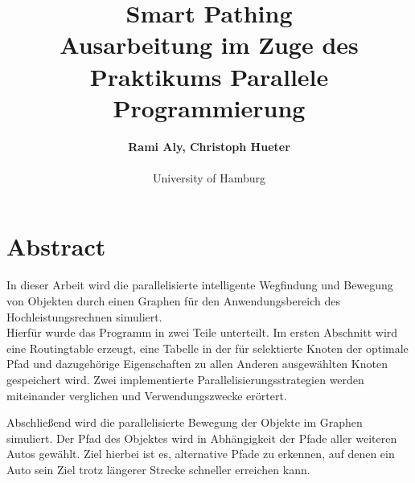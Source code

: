 \documentclass[paper=A4,pagesize=auto,12pt,headinclude=true,footinclude=true,BCOR=0mm,DIV=calc]{scrartcl}
\begin{document}
	
	\title{Smart Pathing\\
	\small{Ausarbeitung im Zuge des Praktikums Parallele Programmierung}}
	\author{\textbf{Rami Aly, Christoph Hueter}\\
	\\University of Hamburg}

	\maketitle
	
	\section*{Abstract}
	In dieser Arbeit wird die parallelisierte intelligente Wegfindung und Bewegung von Objekten durch einen Graphen für den Anwendungsbereich des Hochleistungsrechnen simuliert.\\
	
	Hierfür wurde das Programm in zwei Teile unterteilt. Im ersten Abschnitt wird eine Routingtable erzeugt, eine Tabelle in der für selektierte Knoten der optimale Pfad und dazugehörige Eigenschaften zu allen Anderen ausgewählten Knoten gespeichert wird. Zwei implementierte Parallelisierungsstrategien werden miteinander verglichen und Verwendungszwecke erörtert.
	
	Abschließend wird die parallelisierte Bewegung der Objekte im Graphen simuliert. Der Pfad des Objektes wird in Abhängigkeit der Pfade aller weiteren Autos gewählt. Ziel hierbei ist es, alternative Pfade zu erkennen, auf denen ein Auto sein Ziel trotz längerer Strecke schneller erreichen kann.
	
 
	
	
	
\end{document}
